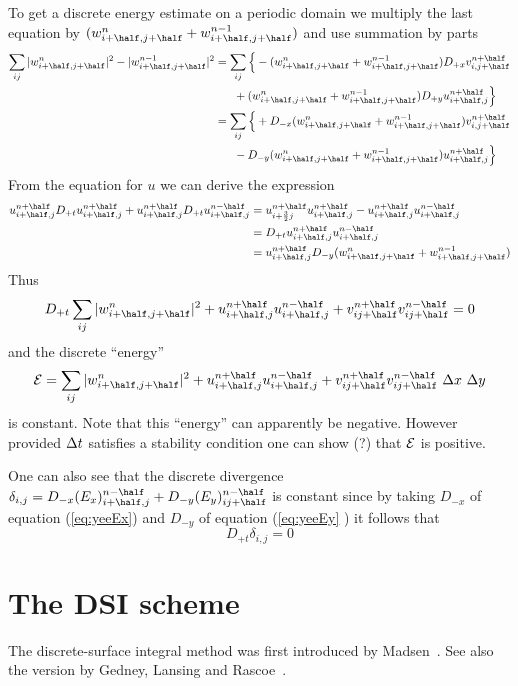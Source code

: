 \documentclass[10pt]{article}
\begin{document}
To get a discrete energy estimate on a periodic domain we multiply the last equation
by $(w_{i\ph,j\ph}^{n}+w_{i\ph,j\ph}^{n-1})$ and use summation by parts
\begin{align*}
\sum_{ij} |w_{i\ph,j\ph}^{n}|^2 - |w_{i\ph,j\ph}^{n-1}|^2 &= 
           \sum_{ij}\Big\{  - (w_{i\ph,j\ph}^{n}+w_{i\ph,j\ph}^{n-1}) D_{+x} v_{i,j\ph}^{n\ph} \\
        &~~~~~       + (w_{i\ph,j\ph}^{n}+w_{i\ph,j\ph}^{n-1}) D_{+y} u_{i\ph,j}^{n\ph} \Big\} \\
  &= \sum_{ij}\Big\{  +D_{-x} (w_{i\ph,j\ph}^{n}+w_{i\ph,j\ph}^{n-1})  v_{i,j\ph}^{n\ph} \\
      &~~~~~           -D_{-y} (w_{i\ph,j\ph}^{n}+w_{i\ph,j\ph}^{n-1}) u_{i\ph,j}^{n\ph} \Big\} 
\end{align*}
From the equation for $u$ we can derive the expression
\begin{align*}
   u_{i\ph,j}^{n\ph}D_{+t} u_{i\ph,j}^{n\ph} + u_{i\ph,j}^{n\ph}D_{+t} u_{i\ph,j}^{n\mh}&=
   u_{i+{3\over2} j}^{n\ph} u_{i\ph,j}^{n\ph} - u_{i\ph,j}^{n\ph} u_{i\ph,j}^{n\mh}  \\
            &= D_{+t} u_{i\ph,j}^{n\ph} u_{i\ph,j}^{n\mh} \\
            &= u_{i\ph,j}^{n\ph} D_{-y}( w_{i\ph,j\ph}^{n}+w_{i\ph,j\ph}^{n-1})
\end{align*}
Thus
\[
D_{+t} \sum_{ij} |w_{i\ph,j\ph}^{n}|^2 + u_{i\ph,j}^{n\ph} u_{i\ph,j}^{n\mh} + v_{ij\ph}^{n\ph} v_{ij\ph}^{n\mh} =0
\]
and the discrete ``energy''
\[
  {\cal E} = \sum_{ij}  |w_{i\ph,j\ph}^{n}|^2
    + u_{i\ph,j}^{n\ph} u_{i\ph,j}^{n\mh} + v_{ij\ph}^{n\ph} v_{ij\ph}^{n\mh} ~\Delta x~\Delta y
\]
is constant.  Note that this ``energy'' can apparently be negative. However provided ${\Delta t}$
satisfies a stability condition one can show (?) that ${\cal E}$ is positive.
 
One can also see that 
the discrete divergence $\delta_{i,j} = D_{-x}(E_x)_{i\ph,j}^{n\mh}+D_{-y}(E_y)_{ij\ph}^{n\mh}$
is constant since by taking $D_{-x}$ of equation (\ref{eq:yeeEx}) and $D_{-y}$ of equation (\ref{eq:yeeEy} )
it follows that
\[
   D_{+t} \delta_{i,j} = 0
\]   


\section{The DSI scheme}

The discrete-surface integral method was first introduced by Madsen~\cite{Madsen95}. See also
the version by Gedney, Lansing and Rascoe~\cite{Gedney96}.
\end{document}
